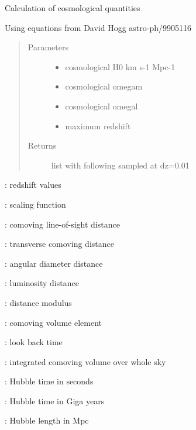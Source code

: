 \documentclass[letterpaper,10pt,english]{sphinxmanual}
\begin{document}
\begin{fulllineitems}
\label{\detokenize{astro_functions:astro.cosmo}}
Calculation of cosmological quantities

\begin{DUlineblock}{0em}
\item[] Using equations from David Hogg astro-ph/9905116
\end{DUlineblock}
\begin{quote}\begin{description}
\item[{Parameters}] \leavevmode\begin{itemize}
\item {} 
 \textendash{} cosmological H0 km s-1 Mpc-1

\item {} 
 \textendash{} cosmological omegam

\item {} 
 \textendash{} cosmological omegal

\item {} 
 \textendash{} maximum redshift

\end{itemize}

\item[{Returns}] \leavevmode
list with following sampled at dz=0.01

\end{description}\end{quote}

\begin{DUlineblock}{0em}
\item[] :      redshift values
\item[] :     scaling function
\item[] :     comoving line-of-sight distance
\item[] :     transverse comoving distance
\item[] :     angular diameter distance
\item[] :     luminosity distance
\item[] :  distance modulus
\item[] :    comoving volume element
\item[] :  look back time
\item[] :     integrated comoving volume over whole sky
\item[] :  Hubble time in seconds
\item[] :  Hubble time in Giga years
\item[] :  Hubble length in Mpc
\end{DUlineblock}


\end{fulllineitems}
\end{document}
